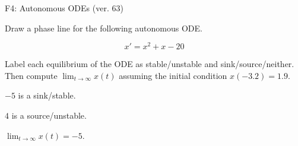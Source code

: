 \begin{exercise}
  \begin{exerciseTitle}F4: Autonomous ODEs (ver. 63)\end{exerciseTitle}
  \begin{exerciseStatement}
    

      Draw a phase line for the following 
      autonomous ODE.
    

    
\[x'= x^{2} + x - 20\]

    

      Label each equilibrium of the ODE
      as stable/unstable and sink/source/neither.
      Then compute \(\lim_{t\to\infty}x(t)\)
      assuming the initial condition
      \(x( -3.2 )= 1.9\).
    

  \end{exerciseStatement}
  \begin{exerciseAnswer}
    

      \(-5\) is a sink/stable.
      
      \(4\) is a source/unstable.
    

    

      \(\lim_{t\to\infty}x(t)=-5\).
    

  \end{exerciseAnswer}
\end{exercise}